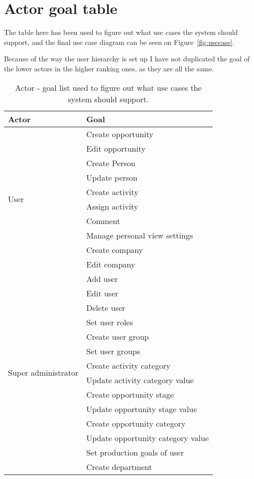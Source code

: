 \chapter{Actor goal table}
\label{app:actor-goal}
The table here has been used to figure out what use cases the system should support, and the final use case diagram can be seen on Figure~\ref{fig:usecase}.

Because of the way the user hierarchy is set up I have not duplicated the goal of the lower actors in the higher ranking ones, as they are all the same.

\begin{table}[h]
  \begin{tabular}{l|l}
    Actor & Goal \\ \hline
    \multirow{10}{*}{User}
    & Create opportunity \\
    & Edit opportunity \\
    & Create Person \\
    & Update person \\
    & Create activity \\
    & Assign activity \\
    & Comment \\
    & Manage personal view settings \\
    & Create company \\
    & Edit company \\
    \hline
    \multirow{14}{*}{Super administrator}
    & Add user \\
    & Edit user \\
    & Delete user \\
    & Set user roles \\
    & Create user group \\
    & Set user groups \\
    & Create activity category \\
    & Update activity category value \\
    & Create opportunity stage \\
    & Update opportunity stage value \\
    & Create opportunity category \\
    & Update opportunity category value \\
    & Set production goals of user \\
    & Create department
  \end{tabular}
  \caption{Actor - goal list used to figure out what use cases the system should support.}
  \label{tab:actor-loal-list}
\end{table}
